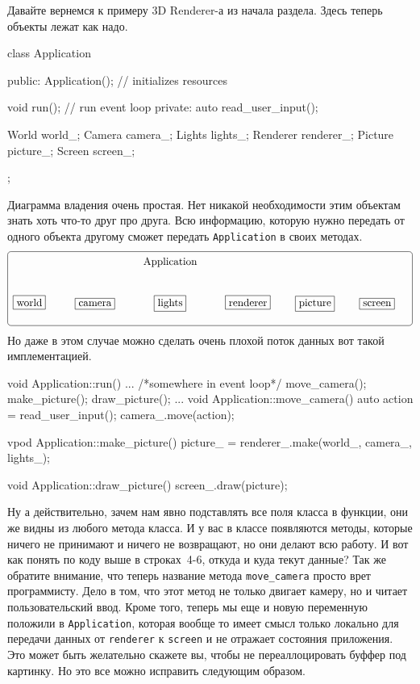 Давайте вернемся к примеру 3D Renderer-а из начала раздела.
Здесь теперь объекты лежат как надо.
\begin{cppcode}
class Application {
public:
  Application(); // initializes resources
  
  void run(); // run event loop
private:
  auto read_user_input();

  World world_;
  Camera camera_;
  Lights lights_;
  Renderer renderer_;
  Picture picture_;
  Screen screen_;
};
\end{cppcode}
Диаграмма владения очень простая.
Нет никакой необходимости этим объектам знать хоть что-то друг про друга.
Всю информацию, которую нужно передать от одного объекта другому сможет передать \verb"Application" в своих методах.
\[
\xymatrix{
  {\phantom{Aworld}}&{}&{\text{Application}}
    	{
	\save
   [ll].[drrr]*+++[F-:<3pt>]\frm{}
   \restore
	}
  &{}&{}&{}\\
  {\text{world}}
      	{
	\save
   [].[]*[F-]\frm{}
   \restore
	}
  &{\text{camera}}
        	{
	\save
   [].[]*[F-]\frm{}
   \restore
	}
  &{\text{lights}}
        	{
	\save
   [].[]*[F-]\frm{}
   \restore
	}
  &{\text{renderer}}
        	{
	\save
   [].[]*[F-]\frm{}
   \restore
	}
  &{\text{picture}}
        	{
	\save
   [].[]*[F-]\frm{}
   \restore
	}
  &{\text{screen}}
        	{
	\save
   [].[]*[F-]\frm{}
   \restore
	}
  \\
}
\]
Но даже в этом случае можно сделать очень плохой поток данных вот такой имплементацией.
\begin{cppcode}
void Application::run() {
  ...
  /*somewhere in event loop*/
  move_camera();
  make_picture();
  draw_picture();
  ...
}
void Application::move_camera() {
  auto action = read_user_input();
  camera_.move(action);
}

vpod Application::make_picture() {
  picture_ = renderer_.make(world_, camera_, lights_);
}

void Application::draw_picture() {
  screen_.draw(picture);
}
\end{cppcode}
Ну а действительно, зачем нам явно подставлять все поля класса в функции, они же видны из любого метода класса.
И у вас в классе появляются методы, которые ничего не принимают и ничего не возвращают, но они делают всю работу.
И вот как понять по коду выше в строках~4-6, откуда и куда текут данные?
Так же обратите внимание, что теперь название метода \verb"move_camera" просто врет программисту.
Дело в том, что этот метод не только двигает камеру, но и читает пользовательский ввод.
Кроме того, теперь мы еще и новую переменную положили в \verb"Application", которая вообще то имеет смысл только локально для передачи данных от \verb"renderer" к \verb"screen" и не отражает состояния приложения.
Это может быть желательно скажете вы, чтобы не переаллоцировать буффер под картинку.
Но это все можно исправить следующим образом.

